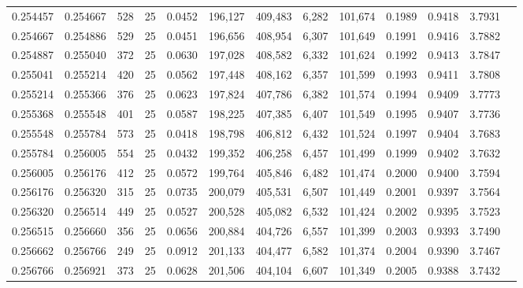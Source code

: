 \begin{tabular}{rrrrrrrrrrrrr}
0.254457 & 0.254667 &   528 &  25 &                                     0.0452 & 196,127 & 409,483 &   6,282 & 101,674 & 0.1989 & 0.9418 & 3.7931 \\
0.254667 & 0.254886 &   529 &  25 &                                     0.0451 & 196,656 & 408,954 &   6,307 & 101,649 & 0.1991 & 0.9416 & 3.7882 \\
0.254887 & 0.255040 &   372 &  25 &                                     0.0630 & 197,028 & 408,582 &   6,332 & 101,624 & 0.1992 & 0.9413 & 3.7847 \\
0.255041 & 0.255214 &   420 &  25 &                                     0.0562 & 197,448 & 408,162 &   6,357 & 101,599 & 0.1993 & 0.9411 & 3.7808 \\
0.255214 & 0.255366 &   376 &  25 &                                     0.0623 & 197,824 & 407,786 &   6,382 & 101,574 & 0.1994 & 0.9409 & 3.7773 \\
0.255368 & 0.255548 &   401 &  25 &                                     0.0587 & 198,225 & 407,385 &   6,407 & 101,549 & 0.1995 & 0.9407 & 3.7736 \\
0.255548 & 0.255784 &   573 &  25 &                                     0.0418 & 198,798 & 406,812 &   6,432 & 101,524 & 0.1997 & 0.9404 & 3.7683 \\
0.255784 & 0.256005 &   554 &  25 &                                     0.0432 & 199,352 & 406,258 &   6,457 & 101,499 & 0.1999 & 0.9402 & 3.7632 \\
0.256005 & 0.256176 &   412 &  25 &                                     0.0572 & 199,764 & 405,846 &   6,482 & 101,474 & 0.2000 & 0.9400 & 3.7594 \\
0.256176 & 0.256320 &   315 &  25 &                                     0.0735 & 200,079 & 405,531 &   6,507 & 101,449 & 0.2001 & 0.9397 & 3.7564 \\
0.256320 & 0.256514 &   449 &  25 &                                     0.0527 & 200,528 & 405,082 &   6,532 & 101,424 & 0.2002 & 0.9395 & 3.7523 \\
0.256515 & 0.256660 &   356 &  25 &                                     0.0656 & 200,884 & 404,726 &   6,557 & 101,399 & 0.2003 & 0.9393 & 3.7490 \\
0.256662 & 0.256766 &   249 &  25 &                                     0.0912 & 201,133 & 404,477 &   6,582 & 101,374 & 0.2004 & 0.9390 & 3.7467 \\
0.256766 & 0.256921 &   373 &  25 &                                     0.0628 & 201,506 & 404,104 &   6,607 & 101,349 & 0.2005 & 0.9388 & 3.7432 \\

\end{tabular}
